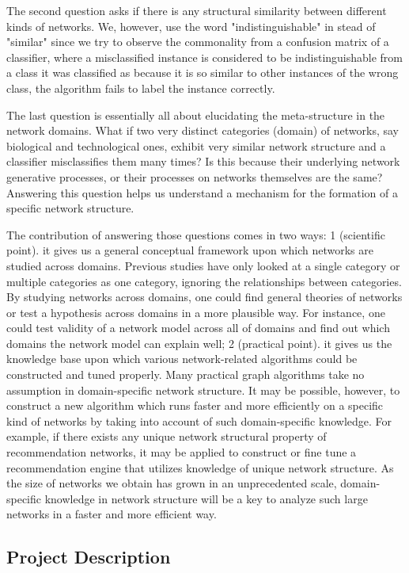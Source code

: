\documentclass{article}
\begin{document}
The second question asks if there is any structural similarity between different kinds of networks. We, however, use the word "indistinguishable" in stead of "similar" since we try to observe the commonality from a confusion matrix of a classifier, where a misclassified instance is considered to be indistinguishable from a class it was classified as because it is so similar to other instances of the wrong class, the algorithm fails to label the instance correctly.


The last question is essentially all about elucidating the meta-structure in the network domains. What if two very distinct categories (domain) of networks, say biological and technological ones, exhibit very similar network structure and a classifier misclassifies them many times? Is this because their underlying network generative processes, or their processes on networks themselves are the same? Answering this question helps us understand a mechanism for the formation of a specific network structure.


The contribution of answering those questions comes in two ways: 1 (scientific point). it gives us a general conceptual framework upon which networks are studied across domains. Previous studies have only looked at a single category or multiple categories as one category, ignoring the relationships between categories. By studying networks across domains, one could find general theories of networks or test a hypothesis across domains in a more plausible way.  For instance, one could test validity of a network model across all of domains and find out which domains the network model can explain well; 2 (practical point). it gives us the knowledge base upon which various network-related algorithms could be constructed and tuned properly.  Many practical graph algorithms take no assumption in domain-specific network structure. It may be possible, however, to construct a new algorithm which runs faster and more efficiently on a specific kind of networks by taking into account of such domain-specific knowledge. For example, if there exists any unique network structural property of recommendation networks,  it may be applied to construct or fine tune a recommendation engine that utilizes knowledge of unique network structure. As the size of networks we obtain has grown in an unprecedented scale, domain-specific knowledge in network structure will be a key to analyze such large networks in a faster and more efficient way.

\subsection{Project Description}
\end{document}
